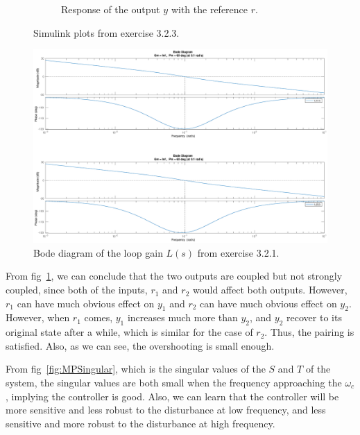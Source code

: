 \documentclass[11pt,a4paper]{article}
\begin{document}
\begin{figure}[!ht]
\begin{subfigure}[t]{.495\linewidth}
		\caption{Response of the output $y$ with the reference $r$.}
		\label{fig:3232}
	\end{subfigure}
	\caption{Simulink plots from exercise 3.2.3.}
	\label{fig:MPSimulink}
\end{figure}
\begin{figure}[!ht]
	\footnotesize
	\centering 
	\includegraphics[width=\textwidth]{321}
	\caption{Bode diagram of the loop gain $L(s)$ from exercise 3.2.1.}
	\label{fig:MPBodeL}
\end{figure}

\par From fig~\ref{fig:3232}, we can conclude that the two outputs are coupled but not strongly coupled, since both of the inputs, $r_{1}$ and $r_{2}$ would affect both outputs. However, $r_{1}$ can have much obvious effect on $y_{1}$ and $r_{2}$ can have much obvious effect on $y_{2}$. However, when $r_{1}$ comes, $y_{1}$ increases much more than $y_{2}$, and $y_{2}$ recover to its original state after a while, which is similar for the case of $r_{2}$. Thus, the pairing is satisfied. Also, as we can see, the overshooting is small enough.

\par From fig~\ref{fig:MPSingular}, which is the singular values of the $S$ and $T$ of the system, the singular values are both small when the frequency approaching the $\omega_{c}$, implying the controller is good. Also, we can learn that the controller will be more sensitive and less robust to the disturbance at low frequency, and less sensitive and more robust to the disturbance at high frequency.
\end{document}
